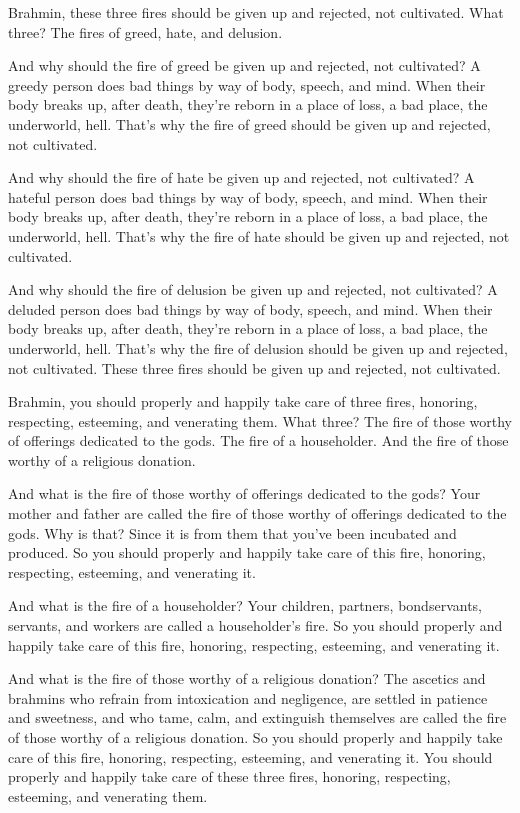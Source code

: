 \documentclass[12pt,openany]{book}%
\begin{document}
Brahmin, these three fires should be given up and rejected, not cultivated. What three? The fires of greed, hate, and delusion. 

And why should the fire of greed be given up and rejected, not cultivated? A greedy person does bad things by way of body, speech, and mind. When their body breaks up, after death, they’re reborn in a place of loss, a bad place, the underworld, hell. That’s why the fire of greed should be given up and rejected, not cultivated. 

And why should the fire of hate be given up and rejected, not cultivated? A hateful person does bad things by way of body, speech, and mind. When their body breaks up, after death, they’re reborn in a place of loss, a bad place, the underworld, hell. That’s why the fire of hate should be given up and rejected, not cultivated. 

And why should the fire of delusion be given up and rejected, not cultivated? A deluded person does bad things by way of body, speech, and mind. When their body breaks up, after death, they’re reborn in a place of loss, a bad place, the underworld, hell. That’s why the fire of delusion should be given up and rejected, not cultivated. These three fires should be given up and rejected, not cultivated. 

Brahmin, you should properly and happily take care of three fires, honoring, respecting, esteeming, and venerating them. What three? The fire of those worthy of offerings dedicated to the gods. The fire of a householder. And the fire of those worthy of a religious donation. 

And what is the fire of those worthy of offerings dedicated to the gods? Your mother and father are called the fire of those worthy of offerings dedicated to the gods. Why is that? Since it is from them that you’ve been incubated and produced. So you should properly and happily take care of this fire, honoring, respecting, esteeming, and venerating it. 

And what is the fire of a householder? Your children, partners, bondservants, servants, and workers are called a householder’s fire. So you should properly and happily take care of this fire, honoring, respecting, esteeming, and venerating it. 

And what is the fire of those worthy of a religious donation? The ascetics and brahmins who refrain from intoxication and negligence, are settled in patience and sweetness, and who tame, calm, and extinguish themselves are called the fire of those worthy of a religious donation. So you should properly and happily take care of this fire, honoring, respecting, esteeming, and venerating it. You should properly and happily take care of these three fires, honoring, respecting, esteeming, and venerating them. 
\end{document}
